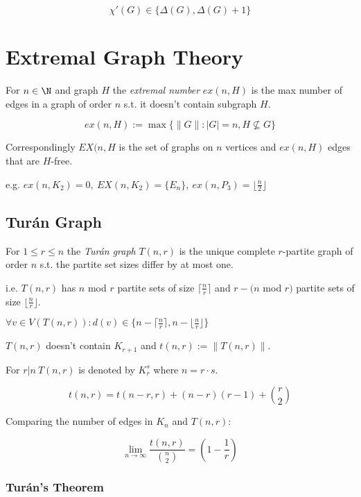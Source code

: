 $$\chi'(G) \in \{\Delta(G), \Delta(G)+1\}$$

\section*{Extremal Graph Theory}

For $n \in \N$ and graph $H$ the \emph{extremal number} $ex(n,H)$ is the max number of edges in a graph of order $n$ s.t. it doesn't contain subgraph $H$.

\vspace*{-3mm}
$$ex(n,H):=\max\{\|G\| : |G|=n, H \not\subseteq G\}$$

Correspondingly $EX(n,H$ is the set of graphs on $n$ vertices and $ex(n,H)$ edges that are $H$-free.

\spacing

e.g. $ex(n,K_2) = 0, \ EX(n,K_2) = \{E_n\}, \ ex(n,P_3)=\lfloor\frac{n}{2}\rfloor$

\subsection*{Tur\'{a}n Graph}

For $1 \leq r \leq n$ the \emph{Tur\'{a}n graph} $T(n,r)$ is the unique complete $r$-partite graph of order $n$ s.t. the partite set sizes differ by at most one.

\spacing

i.e. $T(n,r)$ has $n$ mod $r$ partite sets of size $\lceil\frac{n}{r}\rceil$ and $r - (n$ mod $r)$ partite sets of size $\lfloor\frac{n}{r}\rfloor$.

$\forall v \in V(T(n,r)) : d(v) \in \{ n - \lceil\frac{n}{r}\rceil, n - \lfloor\frac{n}{r}\rfloor \}$

\spacing

$T(n,r)$ doesn't contain $K_{r+1}$ and $t(n,r) := \|T(n,r)\|$.

For $r | n \ T(n,r)$ is denoted by $K_r^s$ where $n=r \cdot s$.

$$t(n,r) = t(n-r,r)+(n-r)(r-1)+{r \choose 2}$$

\spacing

Comparing the number of edges in $K_n$ and $T(n,r)$:

$$\lim_{n \to \infty} \frac{t(n,r)}{{n \choose 2}} = \left( 1-\frac{1}{r} \right)$$

\subsubsection*{Tur\'{a}n's Theorem}

